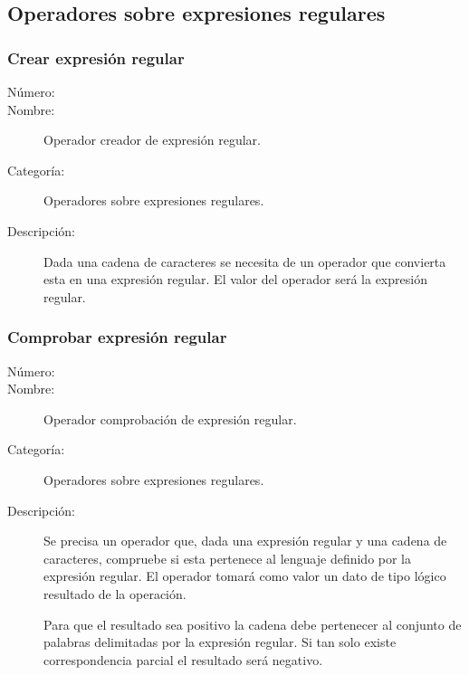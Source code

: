 \subsection{Operadores sobre expresiones regulares}

\subsubsection{Crear expresión regular}
\begin{framed}
	\begin{description}
		\item [Número:] \cn
		\item [Nombre:] Operador creador de expresión regular.
		\item [Categoría:] Operadores sobre expresiones regulares.
		\item [Descripción:] Dada una cadena de caracteres se necesita de un operador que convierta esta en una expresión regular. El
		valor del operador será la expresión regular.
	\end {description}
\end{framed}

\subsubsection{Comprobar expresión regular}
\begin{framed}
	\begin{description}
		\item [Número:] \cn
		\item [Nombre:] Operador comprobación de expresión regular.
		\item [Categoría:] Operadores sobre expresiones regulares.
		\item [Descripción:] Se precisa un operador que, dada una expresión regular y una cadena de caracteres,
		compruebe si esta pertenece al lenguaje definido por la expresión regular. El operador
		tomará como valor un dato de tipo lógico resultado de la operación.
		
		Para que el resultado sea positivo la cadena debe pertenecer al conjunto de palabras delimitadas
		por la expresión regular. Si tan solo existe correspondencia parcial el resultado será negativo.
	\end {description}
\end{framed}

